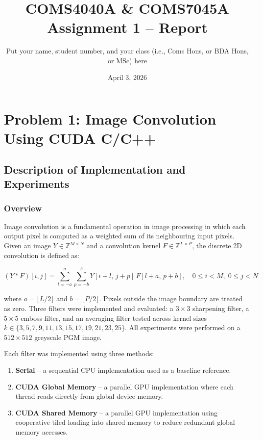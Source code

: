 

\title{COMS4040A \& COMS7045A Assignment 1 -- Report}
\author{Put your name, student number, and your class (i.e., Coms Hons, or BDA Hons, or MSc) here}
\date{April 3, 2026}
\maketitle
\pagestyle{fancy}
\fancyhf{}
\fancyhead[R]{\thepage}

\section{Problem 1: Image Convolution Using CUDA C/C++}

\subsection{Description of Implementation and Experiments}

\subsubsection{Overview}

Image convolution is a fundamental operation in image processing in which each output pixel is computed as a weighted sum of its neighbouring input pixels. Given an image $Y \in \mathbb{Z}^{M \times N}$ and a convolution kernel $F \in \mathbb{Z}^{L \times P}$, the discrete 2D convolution is defined as:

\begin{equation}
(Y * F)[i, j] = \sum_{l=-a}^{a} \sum_{p=-b}^{b} Y[i+l,\, j+p]\, F[l+a,\, p+b], \quad 0 \leq i < M,\; 0 \leq j < N
\end{equation}

where $a = \lfloor L/2 \rfloor$ and $b = \lfloor P/2 \rfloor$. Pixels outside the image boundary are treated as zero. Three filters were implemented and evaluated: a $3 \times 3$ sharpening filter, a $5 \times 5$ emboss filter, and an averaging filter tested across kernel sizes $k \in \{3, 5, 7, 9, 11, 13, 15, 17, 19, 21, 23, 25\}$. All experiments were performed on a $512 \times 512$ greyscale PGM image.

Each filter was implemented using three methods:

\begin{enumerate}
    \item \textbf{Serial} -- a sequential CPU implementation used as a baseline reference.
    \item \textbf{CUDA Global Memory} -- a parallel GPU implementation where each thread reads directly from global device memory.
    \item \textbf{CUDA Shared Memory} -- a parallel GPU implementation using cooperative tiled loading into shared memory to reduce redundant global memory accesses.
\end{enumerate}

